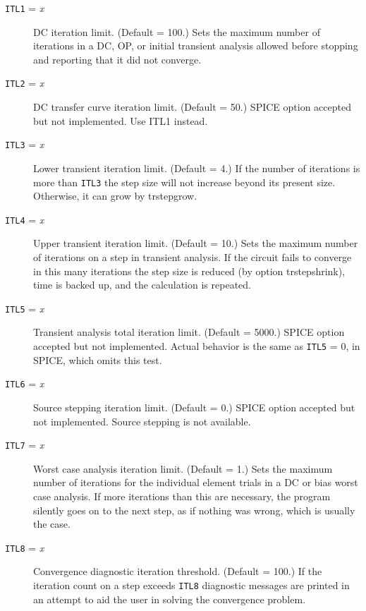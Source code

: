 \begin{description}
\item[{\tt ITL1} = {\it x}] DC iteration limit.  (Default = 100.)
Sets the maximum number of iterations in a DC, OP, or initial
transient analysis allowed before stopping and reporting that it
did not converge.

\item[{\tt ITL2} = {\it x}] DC transfer curve iteration limit.
(Default = 50.)  SPICE option accepted but not implemented.
Use ITL1 instead.

\item[{\tt ITL3} = {\it x}] Lower transient iteration limit.
(Default = 4.)  If the number of iterations is more than {\tt ITL3}
the step size will not increase beyond its present size.  Otherwise,
it can grow by trstepgrow.

\item[{\tt ITL4} = {\it x}] Upper transient iteration limit.
(Default = 10.)  Sets the maximum number of iterations on a step
in transient analysis.  If the circuit fails to converge in this
many iterations the step size is reduced (by option trstepshrink),
time is backed up, and the calculation is repeated.

\item[{\tt ITL5} = {\it x}] Transient analysis total iteration
limit.  (Default = 5000.)  SPICE option accepted but not
implemented.  Actual behavior is the same as {\tt ITL5} = 0, in
SPICE, which omits this test.

\item[{\tt ITL6} = {\it x}] Source stepping iteration limit.
(Default = 0.)  SPICE option accepted but not implemented.
Source stepping is not available.

\item[{\tt ITL7} = {\it x}] Worst case analysis iteration
limit.  (Default = 1.)
Sets the maximum number of iterations for the individual
element trials in a DC or bias worst case analysis.  If more
iterations than this are necessary, the program silently goes
on to the next step, as if nothing was wrong, which is usually
the case.

\item[{\tt ITL8} = {\it x}] Convergence diagnostic iteration threshold.
(Default = 100.)  If the iteration count on a step exceeds {\tt ITL8}
diagnostic messages are printed in an attempt to aid the user in solving the
convergence problem.


\end{description}
